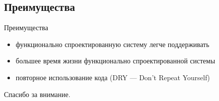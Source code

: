 \documentclass{beamer}
\begin{document}
\subsection{Преимущества}
\begin{frame}[fragile]
Преимущества
\begin{itemize}
	\item функционально спроектированную систему легче поддерживать \pause
	\item большее время жизни функционально спроектированной системы \pause
	\item повторное использование кода (DRY --- Don't Repeat Yourself)
\end{itemize}
\end{frame}

\begin{frame}[fragile]
\begin{center}
	Спасибо за внимание.
\end{center}
\end{frame}
\end{document}
